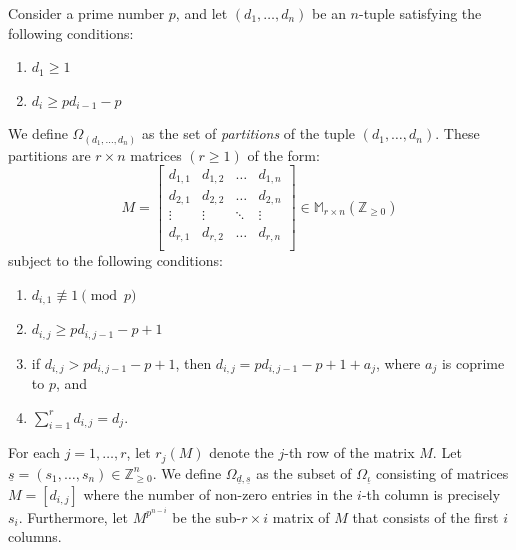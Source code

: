 \documentclass{compositio}
\theoremstyle{remark}
\theoremstyle{remark}
\begin{document}
Consider a prime number $p$, and let $(d_1, \ldots, d_n)$ be an $n$-tuple satisfying the following conditions:
\begin{enumerate}[label*=\alph*)]
\item $d_1 \geq 1$
\item $d_i \geq pd_{i-1}-p$
\end{enumerate}

We define $\Omega_{(d_1,\ldots,d_n)}$ as the set of \textit{partitions} of the tuple $(d_1,\ldots,d_n)$. These partitions are $r\times n$ matrices $(r \geq 1)$ of the form:
               \[ M=\begin{bmatrix}\label{matrixpartition}
d_{1,1} & d_{1,2} & \ldots & d_{1,n} \\
d_{2,1} & d_{2,2} & \ldots & d_{2,n} \\
\vdots  & \vdots  & \ddots & \vdots  \\
d_{r,1} & d_{r,2} & \ldots & d_{r,n} \\
\end{bmatrix} \in \mathbb{M}_{r \times n}(\mathbb{Z}_{\ge 0}) \]
subject to the following conditions:
\begin{enumerate}[label*=\arabic*.]
\item \label{item1condbranchingdatum} $d_{i,1} \not\equiv 1 \pmod{p}$
\item \label{item2condbranchingdatum} $d_{i,j} \geq pd_{i,j-1}-p+1$
\item \label{item3condbranchingdatum} if $d_{i,j}>pd_{i,j-1}-p+1$, then $d_{i,j}=pd_{i,j-1}-p+1+a_j$, where $a_j$ is coprime to $p$, and 
\item \label{item4condbranchingdatum} $\sum_{i=1}^r d_{i,j}=d_j$.
\end{enumerate}
For each $j=1,\ldots,r$, let $r_j(M)$ denote the $j$-th row of the matrix $M$. Let $\underline{s}=(s_1, \ldots, s_n) \in \mathbb{Z}_{\ge 0}^n$. We define $\Omega_{\underline{d}, \underline{s}}$ as the subset of $\Omega_{\underline{\iota}}$ consisting of matrices $M=[d_{i,j}]$ where the number of non-zero entries in the $i$-th column is precisely $s_i$. Furthermore, let $M^{p^{n-i}}$ be the sub-$r \times i$ matrix of $M$ that consists of the first $i$ columns.
\end{document}
